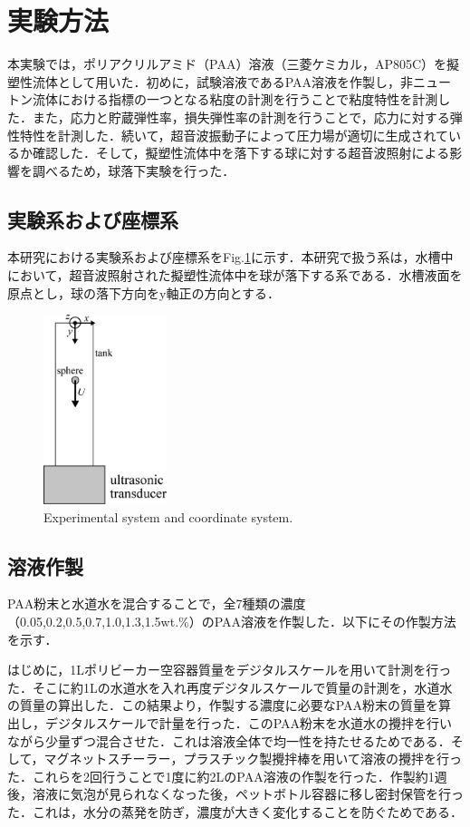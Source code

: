 \section{実験方法}
\label{sec:methods}
本実験では，ポリアクリルアミド（PAA）溶液（三菱ケミカル，AP805C）を擬塑性流体として用いた．初めに，試験溶液であるPAA溶液を作製し，非ニュートン流体における指標の一つとなる粘度の計測を行うことで粘度特性を計測した．また，応力と貯蔵弾性率，損失弾性率の計測を行うことで，応力に対する弾性特性を計測した．続いて，超音波振動子によって圧力場が適切に生成されているか確認した．そして，擬塑性流体中を落下する球に対する超音波照射による影響を調べるため，球落下実験を行った．

\subsection{実験系および座標系}
本研究における実験系および座標系をFig.\ref{fig:system}に示す．本研究で扱う系は，水槽中において，超音波照射された擬塑性流体中を球が落下する系である．水槽液面を原点とし，球の落下方向をy軸正の方向とする．

\begin{figure}[H]
    \centering
    \includegraphics[width=0.32\textwidth]{./2-Methods/device-coordinate.eps}
    \caption{Experimental system and coordinate system.}
    \label{fig:system}
\end{figure}

\subsection{溶液作製}
PAA粉末と水道水を混合することで，全7種類の濃度（0.05,0.2,0.5,0.7,1.0,1.3,1.5wt.\%）のPAA溶液を作製した．以下にその作製方法を示す．

はじめに，1Lポリビーカー空容器質量をデジタルスケールを用いて計測を行った．そこに約1Lの水道水を入れ再度デジタルスケールで質量の計測を，水道水の質量の算出した．この結果より，作製する濃度に必要なPAA粉末の質量を算出し，デジタルスケールで計量を行った．このPAA粉末を水道水の攪拌を行いながら少量ずつ混合させた．これは溶液全体で均一性を持たせるためである．そして，マグネットスチーラー，プラスチック製攪拌棒を用いて溶液の攪拌を行った．これらを2回行うことで1度に約2LのPAA溶液の作製を行った．作製約1週後，溶液に気泡が見られなくなった後，ペットボトル容器に移し密封保管を行った．これは，水分の蒸発を防ぎ，濃度が大きく変化することを防ぐためである．

